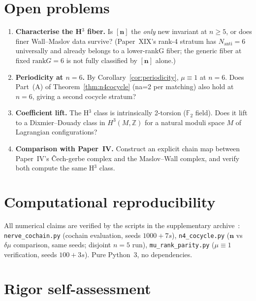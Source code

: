 \documentclass[11pt,a4paper]{article}
\theoremstyle{remark}
\newcommand{\F}{\mathbb{F}}
\newcommand{\Z}{\mathbb{Z}}
\newcommand{\rank}{\mathrm{rank}}
\newcommand{\Nanti}{N_{\mathrm{anti}}}
\begin{document}
\section{Open problems}

\begin{enumerate}
\item \textbf{Characterise the H$^3$ fiber.}
  Is $[\mathbf{n}]$ the \emph{only} new invariant at $n\ge5$, or does
  finer Wall--Maslov data survive?
  (Paper~XIX's rank-4 stratum has $\Nanti=6$ universally and already belongs
  to a lower-rankG fiber; the generic fiber at fixed $\rank G=6$ is
  not fully classified by $[\mathbf{n}]$ alone.)
\item \textbf{Periodicity at $n=6$.}
  By Corollary~\ref{cor:periodicity}, $\mu\equiv1$ at $n=6$.
  Does Part~(A) of Theorem~\ref{thm:n4cocycle} (na=2 per matching) also
  hold at $n=6$, giving a second cocycle stratum?
\item \textbf{Coefficient lift.}
  The H$^3$ class is intrinsically 2-torsion ($\F_2$ field).
  Does it lift to a Dixmier--Douady class in $H^3(M,\Z)$ for a natural
  moduli space $M$ of Lagrangian configurations?
\item \textbf{Comparison with Paper~IV.}
  Construct an explicit chain map between Paper~IV's \v{C}ech-gerbe complex
  and the Maslov--Wall complex, and verify both compute the same H$^3$ class.
\end{enumerate}

\section*{Computational reproducibility}

All numerical claims are verified by the scripts in the supplementary
archive~\cite{PaperXXsuppl}: \texttt{nerve\_cochain.py} (cochain evaluation,
seeds $1000+7s$), \texttt{n4\_cocycle.py} ($\mathbf{n}$ vs $\delta\mu$
comparison, same seeds; disjoint $n=5$ run), \texttt{mu\_rank\_parity.py}
($\mu\equiv1$ verification, seeds $100+3s$).
Pure Python~3, no dependencies.

\section*{Rigor self-assessment}
\end{document}
